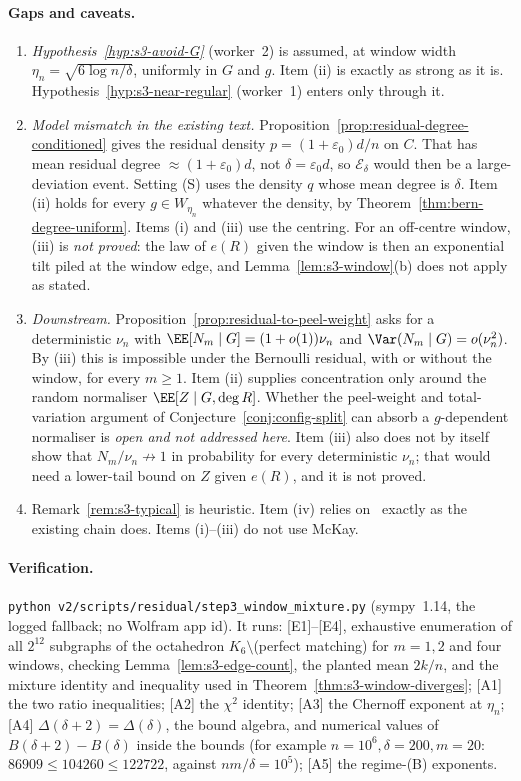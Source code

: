 \paragraph{Gaps and caveats.}
\begin{enumerate}
\item \emph{Hypothesis~\ref{hyp:s3-avoid-G}} (worker~2) is assumed, at window width
\(\eta_n=\sqrt{6\log n/\delta}\), uniformly in \(G\) and \(g\). Item (ii) is exactly as strong
as it is. Hypothesis~\ref{hyp:s3-near-regular} (worker~1) enters only through it.
\item \emph{Model mismatch in the existing text.}
Proposition~\ref{prop:residual-degree-conditioned} gives the residual density
\(p=(1+\varepsilon_0)d/n\) on \(C\). That has mean residual degree
\(\approx(1+\varepsilon_0)d\), not \(\delta=\varepsilon_0d\), so \(\mathcal E_\delta\) would then be a
large-deviation event. Setting (S) uses the density \(q\) whose mean degree is
\(\delta\). Item (ii) holds for every \(g\in W_{\eta_n}\) whatever the density, by
Theorem~\ref{thm:bern-degree-uniform}. Items (i) and (iii) use the centring. For an
off-centre window, (iii) is \emph{not proved}: the law of \(e(R)\) given the window is then
an exponential tilt piled at the window edge, and Lemma~\ref{lem:s3-window}(b) does not
apply as stated.
\item \emph{Downstream.} Proposition~\ref{prop:residual-to-peel-weight} asks for a
deterministic \(\nu_n\) with \(\EE[N_m\mid G]=(1+o(1))\nu_n\) and
\(\Var(N_m\mid G)=o(\nu_n^2)\). By (iii) this is impossible under the Bernoulli residual,
with or without the window, for every \(m\ge1\). Item (ii) supplies concentration only
around the random normaliser \(\EE[Z\mid G,\deg R]\). Whether the peel-weight and
total-variation argument of Conjecture~\ref{conj:config-split} can absorb a
\(g\)-dependent normaliser is \emph{open and not addressed here}. Item (iii) also does
not by itself show that \(N_m/\nu_n\not\to1\) in probability for every deterministic \(\nu_n\);
that would need a lower-tail bound on \(Z\) given \(e(R)\), and it is not proved.
\item Remark~\ref{rem:s3-typical} is heuristic. Item (iv) relies on~\cite[Theorem~4.6]{McK85}
exactly as the existing chain does. Items (i)--(iii) do not use McKay.
\end{enumerate}

\paragraph{Verification.}
\texttt{python v2/scripts/residual/step3\_window\_mixture.py} (sympy~1.14, the logged
fallback; no Wolfram app id). It runs:
[E1]--[E4], exhaustive enumeration of all \(2^{12}\) subgraphs of the octahedron
\(K_6\setminus\)(perfect matching) for \(m=1,2\) and four windows, checking
Lemma~\ref{lem:s3-edge-count}, the planted mean \(2k/n\), and the mixture identity and
inequality used in Theorem~\ref{thm:s3-window-diverges};
[A1] the two ratio inequalities;
[A2] the \(\chi^2\) identity;
[A3] the Chernoff exponent at \(\eta_n\);
[A4] \(\Delta(\delta+2)=\Delta(\delta)\), the bound algebra, and numerical values of
\(B(\delta+2)-B(\delta)\) inside the bounds (for example \(n=10^6,\delta=200,m=20\):
\(86909\le104260\le122722\), against \(nm/\delta=10^5\));
[A5] the regime-(B) exponents.
